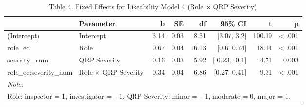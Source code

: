 \documentclass[
]{article}
\begin{document}
\begin{longtable}[t]{llrrrrrr}
\caption{\label{tab:unnamed-chunk-19}Table 4. Fixed Effects for Likeability Model 4 (Role × QRP Severity)}\\
\toprule
 & Parameter & b & SE & df & 95\% CI & t & p\\
\midrule
(Intercept) & Intercept & 3.14 & 0.03 & 8.51 & {}[3.07, 3.2] & 100.19 & < .001\\
role\_ec & Role & 0.67 & 0.04 & 16.13 & {}[0.6, 0.74] & 18.14 & < .001\\
severity\_num & QRP Severity & -0.16 & 0.03 & 5.92 & {}[-0.23, -0.1] & -4.71 & 0.003\\
role\_ec:severity\_num & Role × QRP Severity & 0.34 & 0.04 & 6.86 & {}[0.27, 0.41] & 9.31 & < .001\\
\bottomrule
\multicolumn{8}{l}{\rule{0pt}{1em}\textit{Note: }}\\
\multicolumn{8}{l}{\rule{0pt}{1em}Role: inspector = 1, investigator = −1. QRP Severity: minor = −1, moderate = 0, major = 1.}\\
\end{longtable}
\end{document}

